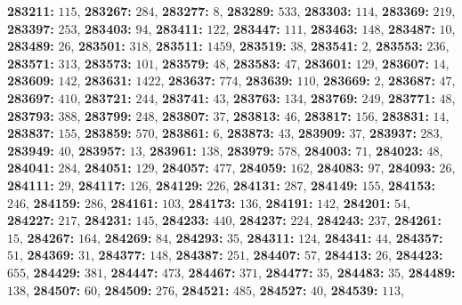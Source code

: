 \textsf{\bfseries 283211:} $115$, \textsf{\bfseries 283267:} $284$, \textsf{\bfseries 283277:} $8$, \textsf{\bfseries 283289:} $533$, \textsf{\bfseries 283303:} $114$, \textsf{\bfseries 283369:} $219$, \textsf{\bfseries 283397:} $253$, \textsf{\bfseries 283403:} $94$, \textsf{\bfseries 283411:} $122$, \textsf{\bfseries 283447:} $111$, \textsf{\bfseries 283463:} $148$, \textsf{\bfseries 283487:} $10$, \textsf{\bfseries 283489:} $26$, \textsf{\bfseries 283501:} $318$, \textsf{\bfseries 283511:} $1459$, \textsf{\bfseries 283519:} $38$, \textsf{\bfseries 283541:} $2$, \textsf{\bfseries 283553:} $236$, \textsf{\bfseries 283571:} $313$, \textsf{\bfseries 283573:} $101$, \textsf{\bfseries 283579:} $48$, \textsf{\bfseries 283583:} $47$, \textsf{\bfseries 283601:} $129$, \textsf{\bfseries 283607:} $14$, \textsf{\bfseries 283609:} $142$, \textsf{\bfseries 283631:} $1422$, \textsf{\bfseries 283637:} $774$, \textsf{\bfseries 283639:} $110$, \textsf{\bfseries 283669:} $2$, \textsf{\bfseries 283687:} $47$, \textsf{\bfseries 283697:} $410$, \textsf{\bfseries 283721:} $244$, \textsf{\bfseries 283741:} $43$, \textsf{\bfseries 283763:} $134$, \textsf{\bfseries 283769:} $249$, \textsf{\bfseries 283771:} $48$, \textsf{\bfseries 283793:} $388$, \textsf{\bfseries 283799:} $248$, \textsf{\bfseries 283807:} $37$, \textsf{\bfseries 283813:} $46$, \textsf{\bfseries 283817:} $156$, \textsf{\bfseries 283831:} $14$, \textsf{\bfseries 283837:} $155$, \textsf{\bfseries 283859:} $570$, \textsf{\bfseries 283861:} $6$, \textsf{\bfseries 283873:} $43$, \textsf{\bfseries 283909:} $37$, \textsf{\bfseries 283937:} $283$, \textsf{\bfseries 283949:} $40$, \textsf{\bfseries 283957:} $13$, \textsf{\bfseries 283961:} $138$, \textsf{\bfseries 283979:} $578$, \textsf{\bfseries 284003:} $71$, \textsf{\bfseries 284023:} $48$, \textsf{\bfseries 284041:} $284$, \textsf{\bfseries 284051:} $129$, \textsf{\bfseries 284057:} $477$, \textsf{\bfseries 284059:} $162$, \textsf{\bfseries 284083:} $97$, \textsf{\bfseries 284093:} $26$, \textsf{\bfseries 284111:} $29$, \textsf{\bfseries 284117:} $126$, \textsf{\bfseries 284129:} $226$, \textsf{\bfseries 284131:} $287$, \textsf{\bfseries 284149:} $155$, \textsf{\bfseries 284153:} $246$, \textsf{\bfseries 284159:} $286$, \textsf{\bfseries 284161:} $103$, \textsf{\bfseries 284173:} $136$, \textsf{\bfseries 284191:} $142$, \textsf{\bfseries 284201:} $54$, \textsf{\bfseries 284227:} $217$, \textsf{\bfseries 284231:} $145$, \textsf{\bfseries 284233:} $440$, \textsf{\bfseries 284237:} $224$, \textsf{\bfseries 284243:} $237$, \textsf{\bfseries 284261:} $15$, \textsf{\bfseries 284267:} $164$, \textsf{\bfseries 284269:} $84$, \textsf{\bfseries 284293:} $35$, \textsf{\bfseries 284311:} $124$, \textsf{\bfseries 284341:} $44$, \textsf{\bfseries 284357:} $51$, \textsf{\bfseries 284369:} $31$, \textsf{\bfseries 284377:} $148$, \textsf{\bfseries 284387:} $251$, \textsf{\bfseries 284407:} $57$, \textsf{\bfseries 284413:} $26$, \textsf{\bfseries 284423:} $655$, \textsf{\bfseries 284429:} $381$, \textsf{\bfseries 284447:} $473$, \textsf{\bfseries 284467:} $371$, \textsf{\bfseries 284477:} $35$, \textsf{\bfseries 284483:} $35$, \textsf{\bfseries 284489:} $138$, \textsf{\bfseries 284507:} $60$, \textsf{\bfseries 284509:} $276$, \textsf{\bfseries 284521:} $485$, \textsf{\bfseries 284527:} $40$, \textsf{\bfseries 284539:} $113$, 
